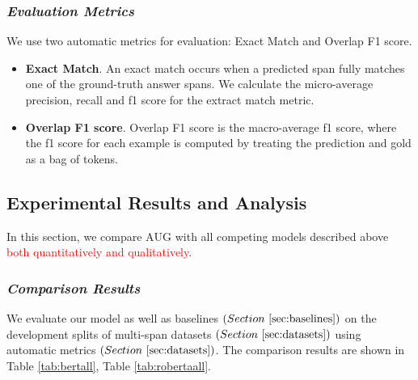 \documentclass[mathematics,article,submit,moreauthors]{Definitions/mdpi}
\newcommand{\1}[1]{\mathds{1}\left[#1\right]}
\begin{document}
	
	\subsubsection{\textit{Evaluation Metrics}}
	\label{sec:metrics}
	We use two automatic metrics for evaluation: Exact Match and Overlap F1 score.
	\begin{itemize}
		\item \textbf{Exact Match}. An exact match occurs when a predicted span fully matches one of the ground-truth
		answer spans. We calculate the micro-average precision, recall and f1 score for the extract match
		metric.
		
		\item \textbf{Overlap F1 score}. Overlap F1 score is the macro-average f1 score, where the f1 score for each
		example is computed by treating the prediction and gold as a bag of tokens.
	\end{itemize}

\subsection{Experimental Results and Analysis}
	In this section, we compare $\text{AUG}$ with all competing models described above \textcolor{red}{both quantitatively and qualitatively}.
	
	\subsubsection{\textit{Comparison Results}}
	We evaluate our model as well as baselines 
	\(( Section ~\ref{sec:baselines} )\) on the development splits of multi-span datasets \(( Section  ~\ref{sec:datasets})\) using automatic metrics \(( Section ~\ref{sec:datasets})\). The comparison results are shown in Table \ref{tab:bertall}, Table \ref{tab:robertaall}.
	
\end{document}
